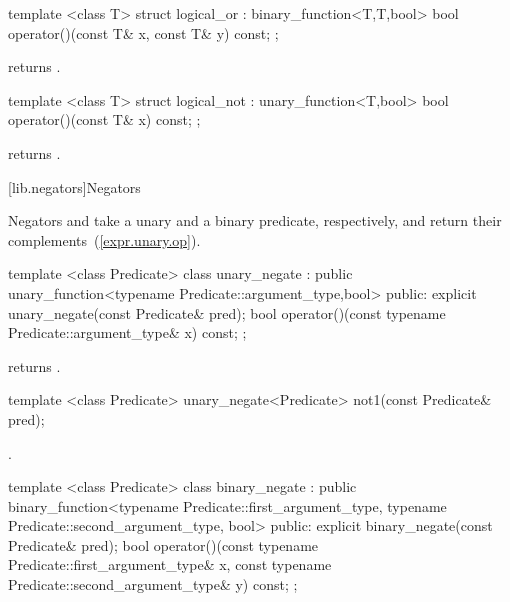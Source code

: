 %
\begin{itemdecl}
template <class T> struct logical_or : binary_function<T,T,bool> {
  bool operator()(const T& x, const T& y) const;
};
\end{itemdecl}

\begin{itemdescr}
\pnum
{} returns .
\end{itemdescr}

%
\begin{itemdecl}
template <class T> struct logical_not : unary_function<T,bool> {
  bool operator()(const T& x) const;
};
\end{itemdecl}

\begin{itemdescr}
\pnum
{} returns .
\end{itemdescr}

[lib.negators]{Negators}

\pnum
Negators  and  take a unary and a binary predicate,
respectively, and return their complements~(\ref{expr.unary.op}).

%
\begin{itemdecl}
template <class Predicate>
  class unary_negate
    : public unary_function<typename Predicate::argument_type,bool> {
public:
  explicit unary_negate(const Predicate& pred);
  bool operator()(const typename Predicate::argument_type& x) const;
};
\end{itemdecl}

\begin{itemdescr}
\pnum
{} returns .
\end{itemdescr}

%
\begin{itemdecl}
template <class Predicate>
  unary_negate<Predicate> not1(const Predicate& pred);
\end{itemdecl}

\begin{itemdescr}
\pnum
\returns
{}.
\end{itemdescr}

%
\begin{itemdecl}
template <class Predicate>
  class binary_negate
    : public binary_function<typename Predicate::first_argument_type,
        typename Predicate::second_argument_type, bool> {
  public:
    explicit binary_negate(const Predicate& pred);
    bool operator()(const typename Predicate::first_argument_type&  x,
        const typename Predicate::second_argument_type& y) const;
  };
\end{itemdecl}

